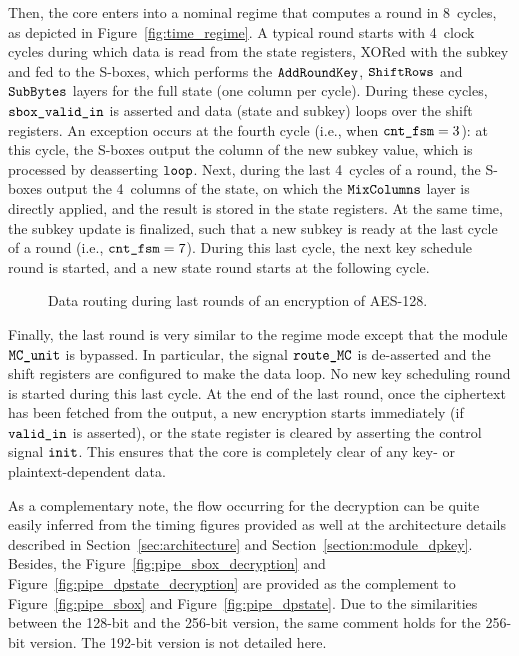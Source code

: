 \documentclass{scrartcl}
\begin{document}
Then, the core enters into a nominal regime that computes a round in 8~cycles,
as depicted in Figure~\ref{fig:time_regime}.  A typical round starts with
4~clock cycles during which data is read from the state registers, XORed with
the subkey and fed to the S-boxes, which performs the $\texttt{AddRoundKey}$, $\texttt{ShiftRows}$ and $\texttt{SubBytes}$
layers for the full state (one column per cycle).  During these cycles,
$\texttt{sbox\_valid\_in}$ is asserted and data (state and subkey) loops over the shift
registers. An exception occurs at the fourth cycle (i.e., when
$\texttt{cnt\_fsm}=3$): at this cycle, the S-boxes output the column of the new
subkey value, which is processed by deasserting $\texttt{loop}$.  Next, during
the last 4~cycles of a round, the S-boxes output the 4~columns of the state, on
which the $\texttt{MixColumns}$ layer is directly applied, and the result is stored in the
state registers. At the same time, the subkey update is finalized, such that a
new subkey is ready at the last cycle of a round (i.e., $\texttt{cnt\_fsm}=7$).
During this last cycle, the next key schedule round is started, and a new state
round starts at the following cycle.

\begin{figure}
    \centering
     
    \caption{Data routing during last rounds of an encryption of AES-128.}
    \label{fig:time_last_round}
\end{figure}

Finally, the last round is very similar to the regime mode except that the
module $\texttt{MC\_unit}$ is bypassed. In particular, the signal
$\texttt{route\_MC}$ is de-asserted and the shift registers are configured to
make the data loop. No new key scheduling round is started during this last
cycle.
At the end of the last round, once the ciphertext has been fetched from the
output, a new encryption starts immediately (if $\texttt{valid\_in}$ is asserted),
or the state register is cleared by asserting the control signal
$\texttt{init}$.
This ensures that the core is completely clear of any key- or
plaintext-dependent data.


As a complementary note, the flow occurring for the decryption can be quite
easily inferred from the timing figures provided as well at the architecture
details described in Section~\ref{sec:architecture} and
Section~\ref{section:module_dpkey}. Besides, the
Figure~\ref{fig:pipe_sbox_decryption} and
Figure~\ref{fig:pipe_dpstate_decryption} are provided as the complement to
Figure~\ref{fig:pipe_sbox} and Figure~\ref{fig:pipe_dpstate}.  Due to the
similarities between the 128-bit and the 256-bit version, the same comment
holds for the 256-bit version. The 192-bit version is not detailed here. 
\end{document}
